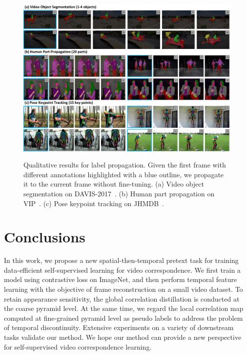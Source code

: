 \documentclass{article}
\begin{document}
\begin{figure}[!tb]
  \centering
  {\includegraphics[width=1.0\textwidth]{figure/quantitative_results/quan.pdf}}
  \caption{\small Qualitative results for label propagation. Given the first frame with different annotations highlighted with a blue outline, we propagate it to the current frame without fine-tuning. (a) Video object segmentation on DAVIS-2017~\cite{pont20172017}. (b) Human part propagation on VIP~\cite{zhou2018adaptive}. (c) Pose keypoint tracking on JHMDB~\cite{jhuang2013towards}. }
  \label{fig:quan}
  \vspace{-6mm}
\end{figure}

\section{Conclusions}
In this work,  we propose a new spatial-then-temporal pretext task for training data-efficient self-supervised learning for video correspondence.  We first train a model using contrastive loss on ImageNet, and then perform temporal feature learning with the objective of frame reconstruction on a small video dataset. To retain appearance sensitivity, the global correlation distillation is conducted at the coarse pyramid level. At the same time, we regard the local correlation map computed at fine-grained pyramid level as pseudo labels to address the problem of temporal discontinuity.  Extensive experiments on a variety of downstream tasks validate our method. We hope our method can provide a new perspective for self-supervised video correspondence learning. 


\medskip
\end{document}
